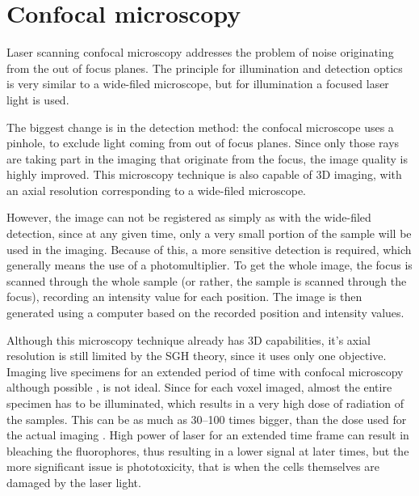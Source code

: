 \documentclass{diploma_style}
\begin{document}
\section{Confocal microscopy}

Laser scanning confocal microscopy \cite{davidovits_photomicrography_1973} addresses the problem of noise originating from the out of focus planes. The principle for illumination and detection optics is very similar to a wide-filed microscope, but for illumination a focused laser light is used.

The biggest change is in the detection method: the confocal microscope uses a pinhole, to exclude light coming from out of focus planes. Since only those rays are taking part in the imaging that originate from the focus, the image quality is highly improved. This microscopy technique is also capable of 3D imaging, with an axial resolution corresponding to a wide-filed microscope.

However, the image can not be registered as simply as with the wide-filed detection, since at any given time, only a very small portion of the sample will be used in the imaging. Because of this, a more sensitive detection is required, which generally means the use of a photomultiplier. To get the whole image, the focus is scanned through the whole sample (or rather, the sample is scanned through the focus), recording an intensity value for each position. The image is then generated using a computer based on the recorded position and intensity values.


Although this microscopy technique already has 3D capabilities, it's axial resolution is still limited by the SGH theory, since it uses only one objective. Imaging live specimens for an extended period of time with confocal microscopy although possible \cite{aldaz_live_2010}, is not ideal. Since for each voxel imaged, almost the entire specimen has to be illuminated, which results in a very high dose of radiation of the samples. This can be as much as 30--100 times bigger, than the dose used for the actual imaging \cite{reynaud_light_2008}. High power of laser for an extended time frame can result in bleaching the fluorophores, thus resulting in a lower signal at later times, but the more significant issue is phototoxicity, that is when the cells themselves are damaged by the laser light.
\end{document}
